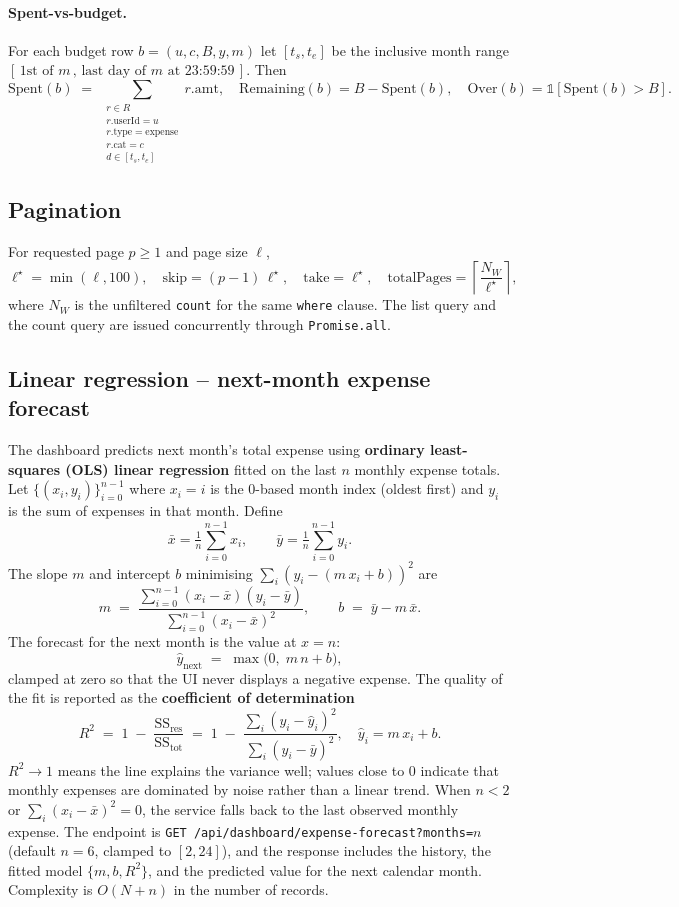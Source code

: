 \documentclass[11pt,a4paper]{article}
\newcommand{\code}[1]{\texttt{\small #1}}
\begin{document}
\paragraph{Spent-vs-budget.} For each budget row
$b=(u,c,B,y,m)$ let $[t_s,t_e]$ be the inclusive month range
$[\,\text{1st of }m\,,\,\text{last day of }m\text{ at 23:59:59}\,]$.
Then
\[
\mathrm{Spent}(b) \;=\; \!\!\sum_{\substack{r\in R\\ r.\text{userId}=u\\ r.\text{type}=\text{expense}\\ r.\text{cat}=c\\ d \in [t_s,t_e]}} r.\text{amt},
\quad
\mathrm{Remaining}(b) = B - \mathrm{Spent}(b),
\quad
\mathrm{Over}(b) = \mathbb{1}[\mathrm{Spent}(b) > B].
\]

\subsection{Pagination}
For requested page $p \ge 1$ and page size $\ell$,
\[
\ell^\star = \min(\ell, 100), \quad
\text{skip} = (p-1)\,\ell^\star, \quad
\text{take} = \ell^\star, \quad
\text{totalPages} = \left\lceil \frac{N_W}{\ell^\star} \right\rceil,
\]
where $N_W$ is the unfiltered \code{count} for the same \code{where}
clause. The list query and the count query are issued concurrently
through \code{Promise.all}.

\subsection{Linear regression -- next-month expense forecast}
The dashboard predicts next month's total expense using
\textbf{ordinary least-squares (OLS) linear regression} fitted on the
last $n$ monthly expense totals. Let
$\{(x_i, y_i)\}_{i=0}^{n-1}$ where $x_i = i$ is the 0-based month index
(oldest first) and $y_i$ is the sum of expenses in that month. Define
\[
\bar{x} = \tfrac{1}{n}\sum_{i=0}^{n-1} x_i, \qquad
\bar{y} = \tfrac{1}{n}\sum_{i=0}^{n-1} y_i.
\]
The slope $m$ and intercept $b$ minimising
$\sum_i (y_i - (m\,x_i + b))^2$ are
\[
m \;=\; \frac{\sum_{i=0}^{n-1} (x_i - \bar{x})(y_i - \bar{y})}
              {\sum_{i=0}^{n-1} (x_i - \bar{x})^2},
\qquad
b \;=\; \bar{y} - m\,\bar{x}.
\]
The forecast for the next month is the value at $x = n$:
\[
\hat{y}_{\text{next}} \;=\; \max\!\bigl(0,\; m\,n + b\bigr),
\]
clamped at zero so that the UI never displays a negative expense. The
quality of the fit is reported as the \textbf{coefficient of
determination}
\[
R^2 \;=\; 1 \;-\; \frac{\mathrm{SS}_{\text{res}}}{\mathrm{SS}_{\text{tot}}}
\;=\; 1 \;-\;
\frac{\sum_{i}(y_i - \hat{y}_i)^2}{\sum_{i}(y_i - \bar{y})^2},
\quad \hat{y}_i = m\,x_i + b.
\]
$R^2 \to 1$ means the line explains the variance well; values close to
$0$ indicate that monthly expenses are dominated by noise rather than a
linear trend. When $n<2$ or $\sum_i (x_i-\bar{x})^2 = 0$, the service
falls back to the last observed monthly expense. The endpoint is
\code{GET /api/dashboard/expense-forecast?months=$n$} (default $n=6$,
clamped to $[2,24]$), and the response includes the history, the
fitted model $\{m, b, R^2\}$, and the predicted value for the next
calendar month. Complexity is $O(N + n)$ in the number of records.
\end{document}
